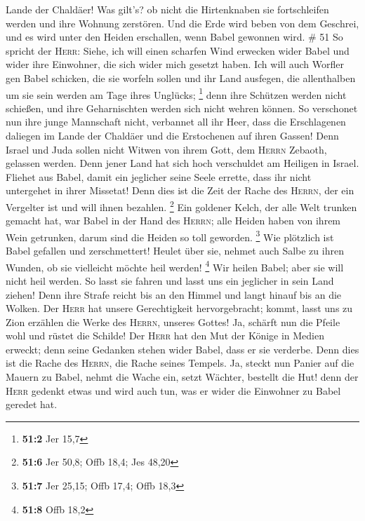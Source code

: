 Lande der Chaldäer! Was gilt's? ob nicht die Hirtenknaben sie
fortschleifen werden und ihre Wohnung zerstören.  Und die
Erde wird beben von dem Geschrei, und es wird unter den Heiden
erschallen, wenn Babel gewonnen wird. \# 51  So spricht
der \textsc{Herr}: Siehe, ich will einen scharfen Wind erwecken wider
Babel und wider ihre Einwohner, die sich wider mich gesetzt haben.
 Ich will auch Worfler gen Babel schicken, die sie worfeln
sollen und ihr Land ausfegen, die allenthalben um sie sein werden am
Tage ihres Unglücks; \footnote{\textbf{51:2} Jer 15,7} 
denn ihre Schützen werden nicht schießen, und ihre Geharnischten werden
sich nicht wehren können. So verschonet nun ihre junge Mannschaft nicht,
verbannet all ihr Heer,  dass die Erschlagenen daliegen im
Lande der Chaldäer und die Erstochenen auf ihren Gassen! 
Denn Israel und Juda sollen nicht Witwen von ihrem Gott, dem
\textsc{Herrn} Zebaoth, gelassen werden. Denn jener Land hat sich hoch
verschuldet am Heiligen in Israel.  Fliehet aus Babel,
damit ein jeglicher seine Seele errette, dass ihr nicht untergehet in
ihrer Missetat! Denn dies ist die Zeit der Rache des \textsc{Herrn}, der
ein Vergelter ist und will ihnen bezahlen. \footnote{\textbf{51:6} Jer
  50,8; Offb 18,4; Jes 48,20}  Ein goldener Kelch, der
alle Welt trunken gemacht hat, war Babel in der Hand des \textsc{Herrn};
alle Heiden haben von ihrem Wein getrunken, darum sind die Heiden so
toll geworden. \footnote{\textbf{51:7} Jer 25,15; Offb 17,4; Offb 18,3}
 Wie plötzlich ist Babel gefallen und zerschmettert!
Heulet über sie, nehmet auch Salbe zu ihren Wunden, ob sie vielleicht
möchte heil werden! \footnote{\textbf{51:8} Offb 18,2} 
Wir heilen Babel; aber sie will nicht heil werden. So lasst sie fahren
und lasst uns ein jeglicher in sein Land ziehen! Denn ihre Strafe reicht
bis an den Himmel und langt hinauf bis an die Wolken. 
Der \textsc{Herr} hat unsere Gerechtigkeit hervorgebracht; kommt, lasst
uns zu Zion erzählen die Werke des \textsc{Herrn}, unseres Gottes!
 Ja, schärft nun die Pfeile wohl und rüstet die Schilde!
Der \textsc{Herr} hat den Mut der Könige in Medien erweckt; denn seine
Gedanken stehen wider Babel, dass er sie verderbe. Denn dies ist die
Rache des \textsc{Herrn}, die Rache seines Tempels.  Ja,
steckt nun Panier auf die Mauern zu Babel, nehmt die Wache ein, setzt
Wächter, bestellt die Hut! denn der \textsc{Herr} gedenkt etwas und wird
auch tun, was er wider die Einwohner zu Babel geredet hat.

